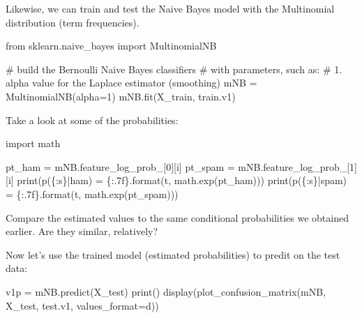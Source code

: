 \documentclass[
  letterpaper,
]{scrbook}
\newenvironment{Shaded}{\begin{snugshade}}{\end{snugshade}}
\newcommand{\BuiltInTok}[1]{\textcolor[rgb]{0.00,0.23,0.31}{#1}}
\newcommand{\CommentTok}[1]{\textcolor[rgb]{0.37,0.37,0.37}{#1}}
\newcommand{\DecValTok}[1]{\textcolor[rgb]{0.68,0.00,0.00}{#1}}
\newcommand{\ImportTok}[1]{\textcolor[rgb]{0.00,0.46,0.62}{#1}}
\newcommand{\NormalTok}[1]{\textcolor[rgb]{0.00,0.23,0.31}{#1}}
\newcommand{\OperatorTok}[1]{\textcolor[rgb]{0.37,0.37,0.37}{#1}}
\newcommand{\SpecialCharTok}[1]{\textcolor[rgb]{0.37,0.37,0.37}{#1}}
\newcommand{\StringTok}[1]{\textcolor[rgb]{0.13,0.47,0.30}{#1}}
\begin{document}
Likewise, we can train and test the Naive Bayes model with the
Multinomial distribution (term frequencies).

\begin{Shaded}
\begin{Highlighting}[]
\ImportTok{from}\NormalTok{ sklearn.naive\_bayes }\ImportTok{import}\NormalTok{ MultinomialNB}

\CommentTok{\# build the Bernoulli Naive Bayes classifiers}
\CommentTok{\# with parameters, such as: }
\CommentTok{\# 1. alpha value for the Laplace estimator (smoothing)}
\NormalTok{mNB }\OperatorTok{=}\NormalTok{ MultinomialNB(alpha}\OperatorTok{=}\DecValTok{1}\NormalTok{)}
\NormalTok{mNB.fit(X\_train, train.v1)}
\end{Highlighting}
\end{Shaded}

Take a look at some of the probabilities:

\begin{Shaded}
\begin{Highlighting}[]
\ImportTok{import}\NormalTok{ math}

\NormalTok{pt\_ham }\OperatorTok{=}\NormalTok{ mNB.feature\_log\_prob\_[}\DecValTok{0}\NormalTok{][i]}
\NormalTok{pt\_spam }\OperatorTok{=}\NormalTok{ mNB.feature\_log\_prob\_[}\DecValTok{1}\NormalTok{][i]}
\BuiltInTok{print}\NormalTok{(}\StringTok{\textquotesingle{}p(}\SpecialCharTok{\{:s\}}\StringTok{|ham) = }\SpecialCharTok{\{:.7f\}}\StringTok{\textquotesingle{}}\NormalTok{.}\BuiltInTok{format}\NormalTok{(t, math.exp(pt\_ham)))}
\BuiltInTok{print}\NormalTok{(}\StringTok{\textquotesingle{}p(}\SpecialCharTok{\{:s\}}\StringTok{|spam) = }\SpecialCharTok{\{:.7f\}}\StringTok{\textquotesingle{}}\NormalTok{.}\BuiltInTok{format}\NormalTok{(t, math.exp(pt\_spam)))}
\end{Highlighting}
\end{Shaded}

Compare the estimated values to the same conditional probabilities we
obtained earlier. Are they similar, relatively?

Now let's use the trained model (estimated probabilities) to predit on
the test data:

\begin{Shaded}
\begin{Highlighting}[]
\NormalTok{v1p }\OperatorTok{=}\NormalTok{ mNB.predict(X\_test)}
\BuiltInTok{print}\NormalTok{()}
\NormalTok{display(plot\_confusion\_matrix(mNB, X\_test, test.v1, values\_format}\OperatorTok{=}\StringTok{\textquotesingle{}d\textquotesingle{}}\NormalTok{))}
\end{Highlighting}
\end{Shaded}
\end{document}
